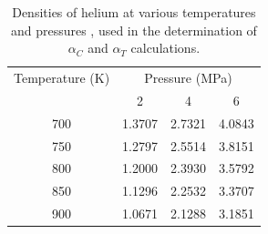 \begin{table}
    \centering 
    \caption{Densities of helium at various temperatures and 
    pressures \cite{petersen_properties_1970}, used in the 
    determination of $\alpha_C$ and $\alpha_T$ calculations.}
    \label{tab:helium_density}
    \begin{tabular}{c c c c}
        \hline
        Temperature (K) & \multicolumn{3}{c}{Pressure (MPa)}\\
         & 2 & 4 & 6\\
        \hline
        700 & 1.3707 & 2.7321 & 4.0843 \\
        750 & 1.2797 & 2.5514 & 3.8151 \\
        800 & 1.2000 & 2.3930 & 3.5792 \\
        850 & 1.1296 & 2.2532 & 3.3707 \\
        900 & 1.0671 & 2.1288 & 3.1851 \\
        \hline
        
    \end{tabular}
\end{table}


